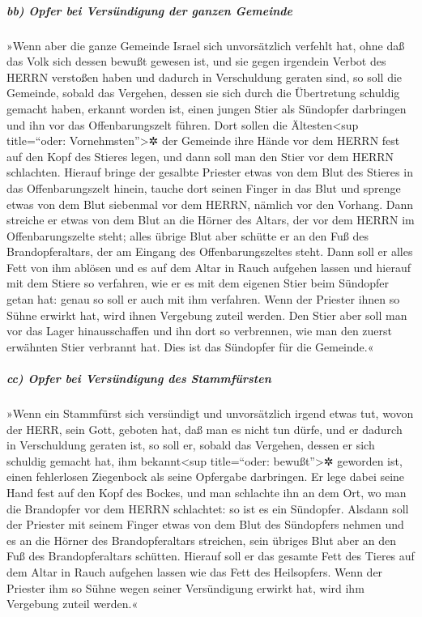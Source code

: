 \hypertarget{bb-opfer-bei-versuxfcndigung-der-ganzen-gemeinde}{%
\subparagraph{bb) Opfer bei Versündigung der ganzen
Gemeinde}\label{bb-opfer-bei-versuxfcndigung-der-ganzen-gemeinde}}

»Wenn aber die ganze Gemeinde Israel sich unvorsätzlich
verfehlt hat, ohne daß das Volk sich dessen bewußt gewesen ist, und sie
gegen irgendein Verbot des HERRN verstoßen haben und dadurch in
Verschuldung geraten sind, so soll die Gemeinde, sobald
das Vergehen, dessen sie sich durch die Übertretung schuldig gemacht
haben, erkannt worden ist, einen jungen Stier als Sündopfer darbringen
und ihn vor das Offenbarungszelt führen. Dort sollen die
Ältesten\textless sup title=``oder: Vornehmsten''\textgreater✲ der
Gemeinde ihre Hände vor dem HERRN fest auf den Kopf des Stieres legen,
und dann soll man den Stier vor dem HERRN schlachten.
Hierauf bringe der gesalbte Priester etwas von dem Blut
des Stieres in das Offenbarungszelt hinein, tauche dort
seinen Finger in das Blut und sprenge etwas von dem Blut siebenmal vor
dem HERRN, nämlich vor den Vorhang. Dann streiche er
etwas von dem Blut an die Hörner des Altars, der vor dem HERRN im
Offenbarungszelte steht; alles übrige Blut aber schütte er an den Fuß
des Brandopferaltars, der am Eingang des Offenbarungszeltes steht.
Dann soll er alles Fett von ihm ablösen und es auf dem
Altar in Rauch aufgehen lassen und hierauf mit dem Stiere
so verfahren, wie er es mit dem eigenen Stier beim Sündopfer getan hat:
genau so soll er auch mit ihm verfahren. Wenn der Priester ihnen so
Sühne erwirkt hat, wird ihnen Vergebung zuteil werden.
Den Stier aber soll man vor das Lager hinausschaffen und
ihn dort so verbrennen, wie man den zuerst erwähnten Stier verbrannt
hat. Dies ist das Sündopfer für die Gemeinde.«

\hypertarget{cc-opfer-bei-versuxfcndigung-des-stammfuxfcrsten}{%
\subparagraph{cc) Opfer bei Versündigung des
Stammfürsten}\label{cc-opfer-bei-versuxfcndigung-des-stammfuxfcrsten}}

»Wenn ein Stammfürst sich versündigt und unvorsätzlich
irgend etwas tut, wovon der HERR, sein Gott, geboten hat, daß man es
nicht tun dürfe, und er dadurch in Verschuldung geraten ist,
so soll er, sobald das Vergehen, dessen er sich schuldig
gemacht hat, ihm bekannt\textless sup title=``oder:
bewußt''\textgreater✲ geworden ist, einen fehlerlosen Ziegenbock als
seine Opfergabe darbringen. Er lege dabei seine Hand fest
auf den Kopf des Bockes, und man schlachte ihn an dem Ort, wo man die
Brandopfer vor dem HERRN schlachtet: so ist es ein Sündopfer.
Alsdann soll der Priester mit seinem Finger etwas von dem
Blut des Sündopfers nehmen und es an die Hörner des Brandopferaltars
streichen, sein übriges Blut aber an den Fuß des Brandopferaltars
schütten. Hierauf soll er das gesamte Fett des Tieres auf
dem Altar in Rauch aufgehen lassen wie das Fett des Heilsopfers. Wenn
der Priester ihm so Sühne wegen seiner Versündigung erwirkt hat, wird
ihm Vergebung zuteil werden.«

